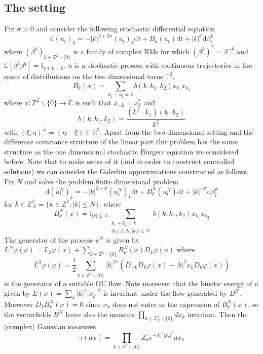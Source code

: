 \documentclass[11pt,a4paper,draft,reqno]{amsart}
\newcommand{\TT}{\mathbb{T}}
\newcommand{\II}{\mathbb{I}}
\newcommand{\RR}{\mathbb{R}}
\newcommand{\ZZ}{\mathbb{Z}}
\newcommand{\CC}{\mathbb{C}}
\newcommand{\expect}{\mathbb{E}}
\newcommand{\dd}{\mathrm{d}}
\newcommand{\Q}{\ZZ^2\backslash\{0\}}
\newcommand{\QN}{\ZZ^2_N\backslash\{0\}}
\begin{document}
\subsection{The setting}
Fix $\sigma>0$ and consider the following stochastic differential equation
\begin{equation}
\label{eq:ns}
\dd (u_{t})_k = - |k|^{2+2\sigma} (u_{t})_k \dd t +  B_k(u_t) \dd t + |k|^{\sigma} \dd \beta^k_t
\end{equation}
where $(\beta^k)_{k\in \Q}$ is a family of complex BMs for which $(\beta^k)^* = \beta^{-k}$ and $\expect[\beta^k \beta^q] = \II_{q+k=0}$, $u$ is a stochastic process with continuous trajectories in the space of distributions on the two dimensional torus $\TT^2$,
$$
 B_k(x) = \sum_{k_1+k_2=k} b(k,k_1,k_2) x_{k_1} x_{k_2}
$$
where $x: \Q \to \CC$ is such that $x_{-k} = x_k^*$ and
$$
b(k,k_1,k_2) = \frac{(k^\bot \cdot k_1)(k \cdot k_2)}{k^2}
$$
with $(\xi,\eta)^\bot = (\eta,-\xi) \in \RR^2$. Apart from the two-dimensional setting and the difference covariance structure of the linear part this problem has the same structure as the one dimensional stochastic Burgers equation we considered before. 
Note that to make sense of it (and in order to construct controlled solutions)
we can consider the  Galerkin approximations constructed as follows. Fix $N$ and solve the  problem finite dimensional problem
\begin{equation}
\label{eq:ns-N}
\dd (u^N_{t})_k = - |k|^{2+\sigma} (u^N_{t})_k \dd t +  B^N_k(u^N_t) \dd t + |k|^{-\sigma} \dd \beta^k_t
\end{equation}
for $k \in \ZZ^2_N = \{k \in \ZZ^2 : |k| \le N\}$, where
\begin{equation}
\label{eq:drift-N}
 B^N_k(x) =\II_{|k|\le N} \sum_{\substack{k_1+k_2=k\\|k_1|\le N, |k_2|\le N}} b(k,k_1,k_2) x_{k_1} x_{k_2} 
 \end{equation}
The generator of the process $u^N$ is given by
$
L^N\varphi(x) = L_0\varphi(x) + \sum_{k\in \Q} B^N_k(x) D_k \varphi(x)
$
where
$$
L^0 \varphi(x) = \frac12  \sum_{k\in \Q} |k|^{2\sigma}( D_{-k}D_k\varphi(x) -|k|^2 x_k D_k \varphi(x))  
$$
is the generator of a suitable OU flow. Note moreover that the kinetic energy of $u$ given by
$
E(x) = \sum_k |k|^{2} |x_k|^2 
$
is invariant under the flow generated by $B^N$. Moreover
$
D_{k} B^N_k(x) = 0 
$
since $x_k$ does not enter in the expression of $B^N_k(x)$, so the vectorfields $B^N$ leave also the measure
$
\prod_{k \in \QN}  dx_k 
$
invariant. Then  the  (complex) Gaussian measures
$$
\gamma(dx) = \prod_{k \in \Q} Z_k e^{-|k|^2 |x_k|^2} dx_k
$$
\end{document}
